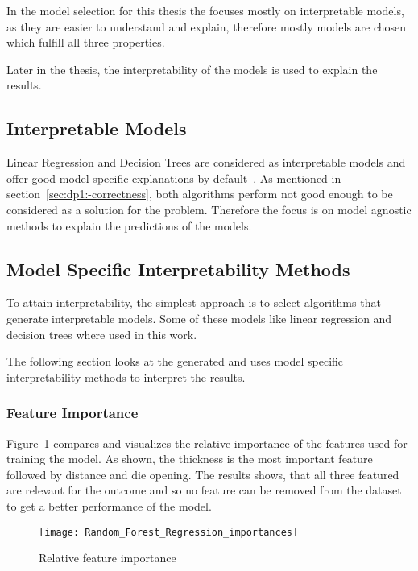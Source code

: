 In the model selection for this thesis the focuses mostly on interpretable models,
as they are easier to understand and explain, therefore mostly models are chosen which fulfill
all three properties.

Later in the thesis, the interpretability of the models is used to explain
the results.

\subsection{Interpretable Models}\label{subsec:interpretable-models}
Linear Regression and Decision Trees are considered as interpretable models and offer good
model-specific explanations by default~\cite{molnar2020interpretable}.
As mentioned in section~\ref{sec:dp1:-correctness}, both algorithms perform not good enough
to be considered as a solution for the problem.
Therefore the focus is on model agnostic methods to explain the predictions of the models.


\subsection{Model Specific Interpretability
Methods}\label{subsec:model-specific-interpretability
-methods}

To attain interpretability, the simplest approach is to select algorithms
that generate
interpretable models.
Some of these models like linear regression and decision trees where used in
this work.

The following section looks at the generated and uses model specific
interpretability methods to
interpret the results.

\subsubsection{Feature Importance}

Figure~\ref{fig:rf_feature_importance} compares and visualizes the relative
importance of the features used for training the model.
As shown, the thickness is the most important feature followed by distance
and die opening.
The results shows, that all three featured are relevant for the outcome and so no feature can be
removed from the dataset to get a better performance of the model.

\begin{figure}[H]
    \begin{tcolorbox}[arc=0pt,boxrule=0.5pt]
        \centering
        \texttt{[image: Random\_Forest\_Regression\_importances]}
        \caption{Relative feature importance}
        \label{fig:rf_feature_importance}
    \end{tcolorbox}
\end{figure}

